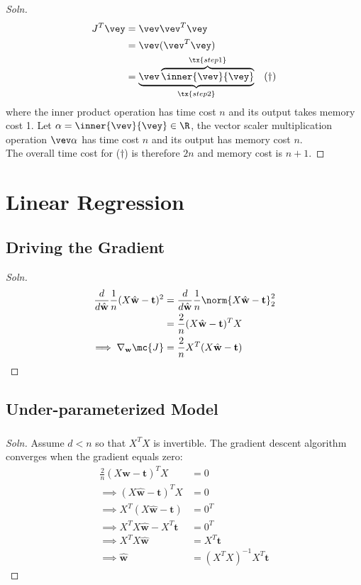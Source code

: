 \documentclass{article}
\begin{document}
	\subsubsection{}
	\begin{proof}[Soln]
		\begin{align}
			J^T \vey &= \vev \vev^T \vey \\
			&= \vev (\vev^T \vey) \\
			&= \underbrace{\vev \overbrace{\inner{\vev}{\vey}}^{\tx{step 1}}}_{\tx{step 2}}\quad (\dagger)
		\end{align}
		where the inner product operation has time cost $n$ and its output takes memory cost 1. Let $\alpha = \inner{\vev}{\vey} \in \R$, the vector scaler multiplication operation $\vev \alpha$ has time cost $n$ and its output has memory cost $n$. \\
		The overall time cost for ($\dagger$) is therefore $2n$ and memory cost is $n + 1$.
	\end{proof}

	\section{Linear Regression}
	\subsection{Driving the Gradient}
	\begin{proof}[Soln]
		\begin{align}
			\frac{d}{d\hat{\textbf{w}}} \frac{1}{n} (X \hat{\textbf{w}} - \textbf{t})^2
			&= \frac{d}{d\hat{\textbf{w}}} \frac{1}{n} \norm{X \hat{\textbf{w}} - \textbf{t}}^2_2 \\
			&= \frac{2}{n} (X \hat{\textbf{w}} - \textbf{t})^T X \\
		\implies \nabla_{\textbf{w}} \mc{J} &= \frac{2}{n} X^T(X\hat{\textbf{w}} - \textbf{t})
		\end{align}
	\end{proof}

	\subsection{Under-parameterized Model}
	\subsubsection{}
	\begin{proof}[Soln]
		Assume $d < n$ so that $X^T X$ is invertible. The gradient descent algorithm converges when the gradient equals zero:
		\begin{align}
			\frac{2}{n} (X \hat{\textbf{w}} - \textbf{t})^T X &= 0 \\
			\implies (X \hat{\textbf{w}} - \textbf{t})^T X &= 0 \\
			\implies X^T (X \hat{\textbf{w}} - \textbf{t}) &= 0^T \\
			\implies X^T X \hat{\textbf{w}} - X^T \textbf{t} &= 0^T \\
			\implies X^T X \hat{\textbf{w}} &= X^T \textbf{t} \\
			\implies \hat{\textbf{w}} &= (X^T X)^{-1} X^T \textbf{t}
		\end{align}
	\end{proof}
\end{document}
